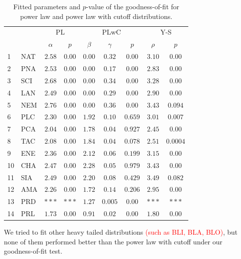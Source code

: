 \documentclass[aps,prl,floatfix,twocolumn]{revtex4-1}
\begin{document}
\begin{table}
 \begin{tabular}{l|l||c|c||c|c|c||c|c}
  && \multicolumn{2}{c||}{PL} & \multicolumn{3}{c||}{PLwC} & \multicolumn{2}{c}{Y-S} \\
  && $\alpha$ & $p$ & $\beta$ & $\gamma$ & $p$ & $\rho$ & $p$ \\
  \hline
  \hline 1 & NAT & $2.58$ & $0.00$ & $0.00$ & $0.32$ & $0.00$ & $3.10$ & $0.00$  \\
  \hline 2 & PNA & $2.53$ & $0.00$ & $0.00$ & $0.17$ & $0.00$ & $2.83$ & $0.00$  \\
  \hline 3 & SCI & $2.68$ & $0.00$ & $0.00$ & $0.34$ & $0.00$ & $3.28$ & $0.00$  \\
  \hline 4 & LAN & $2.49$ & $0.00$ & $0.00$ & $0.29$ & $0.00$ & $2.90$ & $0.00$  \\
  \hline 5 & NEM & $2.76$ & $0.00$ & $0.00$ & $0.36$ & $0.00$ & $3.43$ & $0.094$ \\
  \hline 6 & PLC & $2.30$ & $0.00$ & $1.92$ & $0.10$ & $0.659$ & $3.01$ & $0.007$ \\
  \hline 7 & PCA & $2.04$ & $0.00$ & $1.78$ & $0.04$ & $0.927$ & $2.45$ & $0.00$  \\
  \hline 8 & TAC & $2.08$ & $0.00$ & $1.84$ & $0.04$ & $0.078$ & $2.51$ & $0.0004$ \\
  \hline 9 & ENE & $2.36$ & $0.00$ & $2.12$ & $0.06$ & $0.199$ & $3.15$ & $0.00$  \\
  \hline 10 & CHA & $2.47$ & $0.00$ & $2.28$ & $0.05$ & $0.979$ & $3.43$ & $0.00$  \\
  \hline 11 & SIA & $2.49$ & $0.00$ & $2.20$ & $0.08$ & $0.429$ & $3.49$ & $0.082$ \\
  \hline 12 & AMA & $2.26$ & $0.00$ & $1.72$ & $0.14$ & $0.206$ & $2.95$ & $0.00$  \\
  \hline 13 & PRD & $***$ & $***$ & $1.27$ & $0.005$ & $0.00$ & $***$ & $***$ \\
  \hline 14 & PRL & $1.73$ & $0.00$ & $0.91$ & $0.02$ & $0.00$ & $1.80$ & $0.00$  
 \end{tabular}
 \caption{Fitted parameters and $p$-value of the goodness-of-fit for power law and power law with cutoff distributions.}
 \label{tab:fit_gof}
\end{table}

We tried to fit other heavy tailed distributions \textcolor{red}{(such as BLI, BLA, BLO)}, but none of them performed better than the power law with cutoff under our goodness-of-fit test. 

\end{document}
